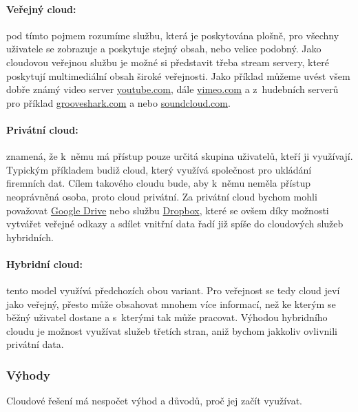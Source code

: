 \paragraph{Veřejný cloud:} pod tímto pojmem rozumíme službu, která je poskytována plošně, pro všechny uživatele se zobrazuje a poskytuje stejný obsah, nebo velice podobný. Jako cloudovou veřejnou službu je možné si představit třeba stream servery, které poskytují multimediální obsah široké veřejnosti. Jako příklad můžeme uvést všem dobře známý video server  \href{http://youtube.com}{youtube.com}, dále \href{http://vimeo.com}{vimeo.com} a z~hudebních serverů pro příklad \href{http://grooveshark.com}{grooveshark.com} a nebo \href{http://soundcloud.com}{soundcloud.com}.

\paragraph{Privátní cloud:} znamená, že k~němu má přístup pouze určitá skupina uživatelů, kteří ji využívají. Typickým příkladem budiž cloud, který využívá společnost pro ukládání firemních dat. Cílem takového cloudu bude, aby k~němu neměla přístup neoprávněná osoba, proto cloud privátní. Za privátní cloud bychom mohli považovat \href{https://drive.google.com}{Google Drive} nebo službu \href{https://dropbox.com/}{Dropbox}, které se ovšem díky možnosti vytvářet veřejné odkazy a sdílet vnitřní data řadí již spíše do cloudových služeb hybridních.

\paragraph{Hybridní cloud:} tento model využívá předchozích obou variant. Pro veřejnost se tedy cloud jeví jako veřejný, přesto může obsahovat mnohem více informací, než ke kterým se běžný uživatel dostane a s~kterými tak může pracovat. Výhodou hybridního cloudu je možnost využívat služeb třetích stran, aniž bychom jakkoliv ovlivnili privátní data.

\subsubsection{Výhody}
Cloudové řešení má nespočet výhod a důvodů, proč jej začít využívat.

